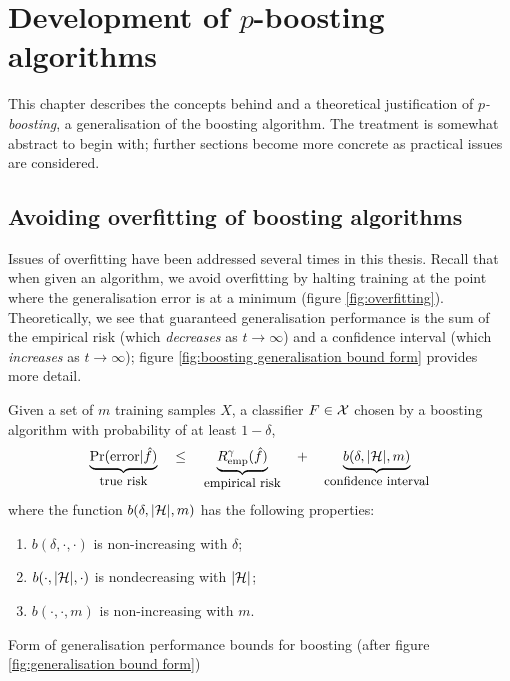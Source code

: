 
\chapter{Development of $p$-boosting algorithms}
\label{chapter:pboosting}

This chapter describes the concepts behind and a theoretical
justification of \emph{$p$-boosting}, a generalisation of the boosting
algorithm.  The treatment is somewhat abstract to begin with; further
sections become more concrete as practical issues are considered.

\section{Avoiding overfitting of boosting algorithms}

Issues of overfitting have been addressed several times in this
thesis.  Recall that when given an algorithm, we avoid overfitting by
halting training at the point where the generalisation error is at a
minimum (figure \ref{fig:overfitting}).  Theoretically, we see that
guaranteed generalisation performance is the sum of the empirical risk
(which \emph{decreases} as $t \rightarrow \infty$) and a confidence
interval (which \emph{increases} as $t \rightarrow \infty$); figure
\ref{fig:boosting generalisation bound form} provides more detail.

\begin{linefigure}
Given a set of $m$ training samples $X$, a classifier $F \in \mathcal{X}$
chosen by a boosting algorithm  with probability of at least $1 - \delta$,
%
\begin{equation}
\underbrace{\Pr(\mathrm{error}|\hat{f})}_{\mbox{\small{true risk}}}
\quad \leq \quad
\underbrace{R_{\mathrm{emp}}^{\gamma}(\hat{f})}_{\mbox{\small{empirical risk}}}
\quad + \quad
\underbrace{b(\delta, |\mathcal{H}|, m)}_{\mbox{\small{confidence interval}}}
\label{eqn:boosting general bound}
\end{equation}
%
where the function $b(\delta, |\mathcal{H}|, m)$ has the following
properties:
\begin{enumerate}
\item	$b(\delta, \cdot, \cdot)$ is non-increasing with $\delta$;
\item	$b(\cdot, |\mathcal{H}|, \cdot)$ is nondecreasing with $|\mathcal{H}|$;
\item	$b(\cdot, \cdot, m)$ is non-increasing with $m$.
\end{enumerate}
\caption{Form of generalisation performance bounds for boosting (after
figure \ref{fig:generalisation bound form})}
\label{fig:boosting generalisation bound form}
\end{linefigure}

